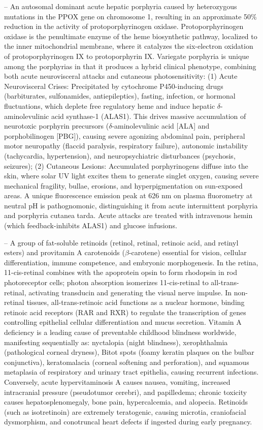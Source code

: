 -- An autosomal dominant acute hepatic porphyria caused by heterozygous mutations in the PPOX gene on chromosome 1, resulting in an approximate 50\% reduction in the activity of protoporphyrinogen oxidase. Protoporphyrinogen oxidase is the penultimate enzyme of the heme biosynthetic pathway, localized to the inner mitochondrial membrane, where it catalyzes the six-electron oxidation of protoporphyrinogen IX to protoporphyrin IX. Variegate porphyria is unique among the porphyrias in that it produces a hybrid clinical phenotype, combining both acute neurovisceral attacks and cutaneous photosensitivity: (1) Acute Neurovisceral Crises: Precipitated by cytochrome P450-inducing drugs (barbiturates, sulfonamides, antiepileptics), fasting, infection, or hormonal fluctuations, which deplete free regulatory heme and induce hepatic $\delta$-aminolevulinic acid synthase-1 (ALAS1). This drives massive accumulation of neurotoxic porphyrin precursors ($\delta$-aminolevulinic acid [ALA] and porphobilinogen [PBG]), causing severe agonizing abdominal pain, peripheral motor neuropathy (flaccid paralysis, respiratory failure), autonomic instability (tachycardia, hypertension), and neuropsychiatric disturbances (psychosis, seizures); (2) Cutaneous Lesions: Accumulated porphyrinogens diffuse into the skin, where solar UV light excites them to generate singlet oxygen, causing severe mechanical fragility, bullae, erosions, and hyperpigmentation on sun-exposed areas. A unique fluorescence emission peak at 626 nm on plasma fluorometry at neutral pH is pathognomonic, distinguishing it from acute intermittent porphyria and porphyria cutanea tarda. Acute attacks are treated with intravenous hemin (which feedback-inhibits ALAS1) and glucose infusions.

-- A group of fat-soluble retinoids (retinol, retinal, retinoic acid, and retinyl esters) and provitamin A carotenoids ($\beta$-carotene) essential for vision, cellular differentiation, immune competence, and embryonic morphogenesis. In the retina, 11-cis-retinal combines with the apoprotein opsin to form rhodopsin in rod photoreceptor cells; photon absorption isomerizes 11-cis-retinal to all-trans-retinal, activating transducin and generating the visual nerve impulse. In non-retinal tissues, all-trans-retinoic acid functions as a nuclear hormone, binding retinoic acid receptors (RAR and RXR) to regulate the transcription of genes controlling epithelial cellular differentiation and mucus secretion. Vitamin A deficiency is a leading cause of preventable childhood blindness worldwide, manifesting sequentially as: nyctalopia (night blindness), xerophthalmia (pathological corneal dryness), Bitot spots (foamy keratin plaques on the bulbar conjunctiva), keratomalacia (corneal softening and perforation), and squamous metaplasia of respiratory and urinary tract epithelia, causing recurrent infections. Conversely, acute hypervitaminosis A causes nausea, vomiting, increased intracranial pressure (pseudotumor cerebri), and papilledema; chronic toxicity causes hepatosplenomegaly, bone pain, hypercalcemia, and alopecia. Retinoids (such as isotretinoin) are extremely teratogenic, causing microtia, craniofacial dysmorphism, and conotruncal heart defects if ingested during early pregnancy.

